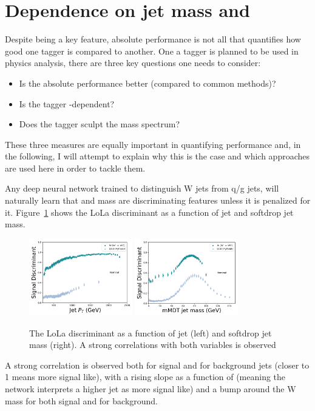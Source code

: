 \section{Dependence on jet mass and \PT}
Despite being a key feature, absolute performance is not all that quantifies how good one tagger is compared to another. One a tagger is planned to be used in physics analysis, there are three key questions one needs to consider:
\begin{itemize}
    \itemsep0em 
    \item Is the absolute performance better (compared to common methods)?
    \item Is the tagger \PT-dependent?
    \item Does the tagger sculpt the mass spectrum?
\end{itemize}
These three measures are equally important in quantifying performance and, in the following, I will attempt to explain why this is the case and which approaches are used here in order to tackle them.\par
Any deep neural network trained to distinguish W jets from q/g jets, will naturally learn that \PT and mass are discriminating features unless it is penalized for it. Figure~\ref{fig:lola:corr} shows the LoLa discriminant as a function of jet \PT and softdrop jet mass. 
\begin{figure}[h!]
\centering
\includegraphics[width=0.4\textwidth]{figures/vtagging/lola/wLola_v6_500rew-profile-jpt.png}
\includegraphics[width=0.4\textwidth]{figures/vtagging/lola/wLola_v6_500rew-profile-jsd0.png}
\caption{The LoLa discriminant as a function of jet \PT (left) and softdrop jet mass (right). A strong correlations with both variables is observed}
\label{fig:lola:corr}
\end{figure}
A strong correlation is observed both for signal and for background jets (closer to 1 means more signal like), with a rising slope as a function of \PT (meaning the network interprets a higher jet \PT as more signal like) and a bump around the W mass for both signal and for background.

